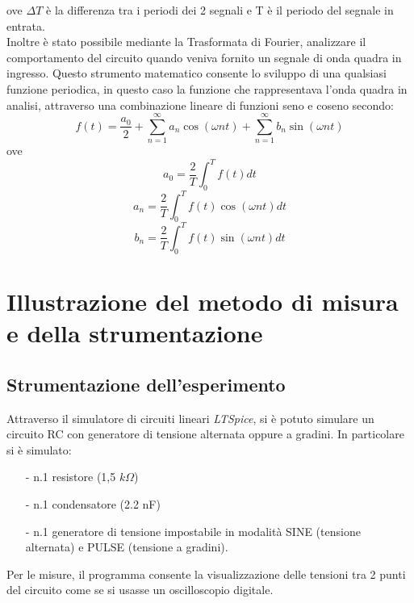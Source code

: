 \documentclass{article}
\begin{document}
\noindent ove $\Delta T$ è la differenza tra i periodi dei 2 segnali e T è il periodo del segnale in
entrata. \\
Inoltre è stato possibile mediante la Trasformata di Fourier, analizzare il comportamento del circuito quando veniva fornito un segnale di onda quadra in ingresso. Questo strumento
matematico consente lo sviluppo di una qualsiasi funzione periodica, in
questo caso la funzione che rappresentava l’onda quadra in analisi, attraverso
una combinazione lineare di funzioni seno e coseno secondo:
\begin{equation}
    f(t) = \frac{a_0}{2} + \sum_{n=1}^{\infty}{a_n \cos(\omega nt)} + \sum_{n=1}^{\infty}{b_n \sin(\omega nt)}
\end{equation}
ove
\begin{equation}
    a_0 = \frac{2}{T}\int_{0}^{T}f(t)dt
\end{equation}
\begin{equation}
    a_n = \frac{2}{T}\int_{0}^{T}f(t)\cos(\omega nt)dt
\end{equation}
\begin{equation}
    b_n = \frac{2}{T}\int_{0}^{T}f(t)\sin(\omega nt)dt
\end{equation}
\section{Illustrazione del metodo di misura e della strumentazione}
\subsection{Strumentazione dell'esperimento}
Attraverso il simulatore di circuiti lineari \emph{LTSpice}, si è potuto simulare un
circuito RC con generatore di tensione alternata oppure a gradini.
In particolare si è simulato:
\begin{itemize}
    \item[-] n.1 resistore (1,5 $k\Omega$)
    \item[-] n.1 condensatore (2.2 nF)
    \item[-] n.1 generatore di tensione impostabile in modalità SINE (tensione alternata) e PULSE (tensione a gradini).
\end{itemize}
Per le misure, il programma consente la visualizzazione delle tensioni
tra 2 punti del circuito come se si usasse un oscilloscopio digitale.
\end{document}

